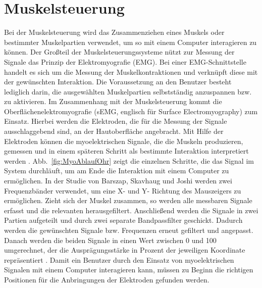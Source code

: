 \section{Muskelsteuerung}

Bei der Muskelsteuerung wird das Zusammenziehen eines Muskels oder bestimmter Muskelpartien verwendet, um so mit einem Computer interagieren zu können.
\newline \newline
Der Großteil der Muskelsteuerungssysteme nützt zur Messung der Signale das Prinzip der Elektromyografie (EMG). Bei einer EMG-Schnittstelle handelt es sich um die Messung der Muskelkontraktionen und verknüpft diese mit der gewünschten Interaktion. Die Voraussetzung an den Benutzer besteht lediglich darin, die ausgewählten Muskelpartien selbstständig anzuspannen bzw. zu aktivieren. Im Zusammenhang mit der Muskelsteuerung kommt die Oberflächenelektromyografie (sEMG, englisch für Surface Electromyography) zum Einsatz. Hierbei werden die Elektroden, die für die Messung der Signale ausschlaggebend sind, an der Hautoberfläche angebracht. Mit Hilfe der Elektroden können die myoelektrischen Signale, die die Muskeln produzieren, gemessen und in einem späteren Schritt als bestimmte Interaktion interpretiert werden \cite{EmgDefinition}.
\newline \newline
Abb.~\ref{fig:MyoAblaufOhr} zeigt die einzelnen Schritte, die das Signal im System durchläuft, um am Ende die Interaktion mit einem Computer zu ermöglichen. In der Studie von Barszap, Skavhaug und Joshi \cite{MyoOhr} werden zwei Frequenzbänder verwendet, um eine X- und Y- Richtung des Mauszeigers zu ermöglichen. Zieht sich der Muskel zusammen, so werden alle messbaren Signale erfasst und die relevanten herausgefiltert. Anschließend werden die Signale in zwei Partien aufgeteilt und durch zwei separate Bandpassfilter geschickt. \newline
Dadurch werden die gewünschten Signale bzw. Frequenzen erneut gefiltert und angepasst. Danach werden die beiden Signale in einen Wert zwischen 0 und 100 umgerechnet, der die Ausprägungsstärke in Prozent der jeweiligen Koordinate repräsentiert \cite{MyoOhr}.
\newline \newline
Damit ein Benutzer durch den Einsatz von myoelektrischen Signalen mit einem Computer interagieren kann, müssen zu Beginn die richtigen Positionen für die Anbringungen der Elektroden gefunden werden.  
